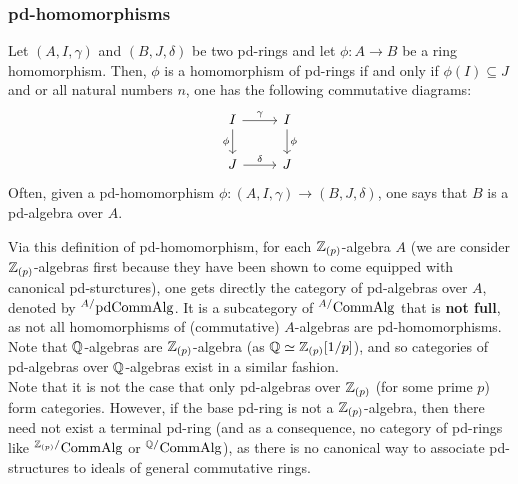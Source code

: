         \subsubsection{pd-homomorphisms}
            \begin{definition}[pd-homomorphisms] \label{def: pd_homomorphisms}
                Let $(A, I , \gamma)$ and $(B, J, \delta)$ be two pd-rings and let $\phi: A \to B$ be a ring homomorphism. Then, $\phi$ is a homomorphism of pd-rings if and only if $\phi(I) \subseteq J$ and or all natural numbers $n$, one has the following commutative diagrams:
                    $$
                        \begin{tikzcd}
                        	{I} & {I} \\
                        	{J} & {J}
                        	\arrow["{\phi}"', from=1-1, to=2-1]
                        	\arrow["{\phi}", from=1-2, to=2-2]
                        	\arrow["{\delta}", from=2-1, to=2-2]
                        	\arrow["{\gamma}", from=1-1, to=1-2]
                        \end{tikzcd}
                    $$
                Often, given a pd-homomorphism $\phi: (A, I, \gamma) \to (B, J, \delta)$, one says that $B$ is a pd-algebra over $A$. 
            \end{definition}
            \begin{remark}
                Via this definition of pd-homomorphism, for each $\mathbb{Z}_{(p)}$-algebra $A$ (we are consider $\mathbb{Z}_{(p)}$-algebras first because they have been shown to come equipped with canonical pd-sturctures), one gets directly the category of pd-algebras over $A$, denoted by ${}^{A/}\mathrm{pd}\mathrm{Comm}\mathrm{Alg}$. It is a subcategory of ${}^{A/}\mathrm{Comm}\mathrm{Alg}$ that is \textbf{not full}, as not all homomorphisms of (commutative) $A$-algebras are pd-homomorphisms. Note that $\mathbb{Q}$-algebras are $\mathbb{Z}_{(p)}$-algebra (as $\mathbb{Q} \simeq \mathbb{Z}_{(p)}[1/p]$), and so categories of pd-algebras over $\mathbb{Q}$-algebras exist in a similar fashion.
                \\
                Note that it is not the case that only pd-algebras over $\mathbb{Z}_{(p)}$ (for some prime $p$) form categories. However, if the base pd-ring is not a $\mathbb{Z}_{(p)}$-algebra, then there need not exist a terminal pd-ring (and as a consequence, no  category of pd-rings like ${}^{\mathbb{Z}_{(p)}/}\mathrm{Comm}\mathrm{Alg}$ or ${}^{\mathbb{Q}/}\mathrm{Comm}\mathrm{Alg}$), as there is no canonical way to associate pd-structures to ideals of general commutative rings.  
            \end{remark}
            
